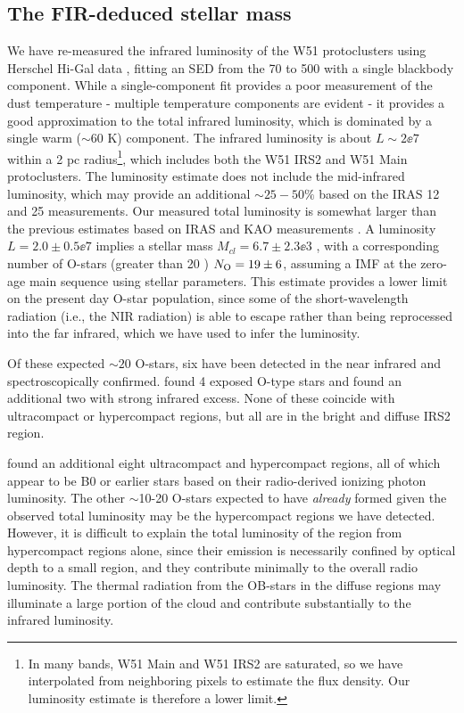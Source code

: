 \subsection{The FIR-deduced stellar mass}
\label{sec:stellarmass}

We have re-measured the infrared luminosity of the W51 protoclusters using Herschel
Hi-Gal data \citep{Molinari2010a,Traficante2011a,Molinari2016a}, fitting an SED from the 70
to 500 \um with a single blackbody component.
While a single-component fit provides a poor
measurement of the dust temperature - multiple temperature components are
evident \citep{Sievers1991a} - it provides a good approximation to the total
infrared luminosity, which is dominated by a single warm ($\sim60$ K)
component.  The infrared luminosity is about $L\sim2\ee{7}$ \lsun within a 2 pc
radius\footnote{In many bands, W51 Main and W51 IRS2 are
saturated, so we have interpolated from neighboring pixels to estimate the flux
density.
Our luminosity estimate is therefore a lower limit.}, which includes
both the W51 IRS2 and W51 Main protoclusters.  The luminosity estimate does not
include the mid-infrared luminosity, which may provide an additional
$\sim25-50\%$ based on
the IRAS 12 and 25 \um measurements.  Our measured total luminosity is somewhat
larger than the previous estimates based on IRAS and KAO measurements
\citep{Harvey1986a,Sievers1991a}.
A luminosity $L=2.0\pm0.5\ee{7}$ \lsun implies
a stellar mass $M_{cl} = 6.7 \pm 2.3\ee{3}$ \msun, with a corresponding number of
O-stars (greater than 20 \msun) $N_{\rm O} = 19 \pm 6$, assuming a
\citet{Kroupa2001a} IMF at the zero-age main sequence using \citet{Vacca1996a}
stellar parameters.  This estimate provides a lower limit on the present day
O-star population, since some of the short-wavelength radiation (i.e., the NIR
radiation) is able to escape rather than being reprocessed into the far
infrared, which we have used to infer the luminosity.

Of these expected $\sim20$ O-stars, six have been detected in the near infrared
and spectroscopically confirmed.  \citet{Figueredo2008a} found 4 exposed O-type
stars and \citet{Barbosa2008a} found an additional two with strong infrared
excess.  None of these coincide with ultracompact or hypercompact \hii regions,
but all are in the bright and diffuse IRS2 \hii region.

\citet{Mehringer1994a} found an additional eight ultracompact and hypercompact
\hii regions, all of which appear to be B0 or earlier stars based on their
radio-derived ionizing photon luminosity.  The other $\sim$10-20 O-stars
expected to have \emph{already} formed given the observed total luminosity may
be the hypercompact \hii regions we have detected.  However, it is difficult to
explain the total luminosity of the region from hypercompact \hii regions
alone, since their emission is necessarily confined by optical depth to a small
region, and they contribute minimally to the overall radio luminosity.  The
thermal radiation from the OB-stars in the diffuse \hii regions may illuminate
a large portion of the cloud and contribute substantially to the infrared
luminosity.

